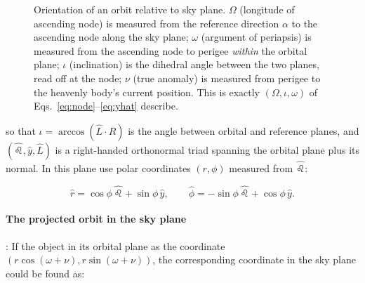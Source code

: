 \documentclass[11pt]{article}
\newcommand{\hatn}{\hat \leo}
\newcommand{\rhat}{\hat r}
\newcommand{\phihat}{\hat\phi}
\begin{document}
\begin{figure}[H]
{}
    \caption{Orientation of an orbit relative to sky plane. $\Omega$ (longitude of ascending node) is measured from the reference direction $\alpha$ to the ascending node along the sky plane; $\omega$ (argument of periapsis) is measured from the ascending node to perigee \emph{within} the orbital plane; $\iota$ (inclination) is the dihedral angle between the two planes, read off at the node; $\nu$ (true anomaly) is measured from perigee to the heavenly body's current position. This is exactly $(\Omega,\iota,\omega)$ of Eqs.~\eqref{eq:node}--\eqref{eq:yhat} describe.}
\label{fig:elements}
\end{figure}
so that $\iota=\arccos(\hat L\cdot\hat R)$ is the angle between orbital and reference planes, and $(\hatn,\hat y,\hat L)$ is a right-handed orthonormal triad spanning the orbital plane plus its normal. In this plane use polar coordinates $(r,\phi)$ measured from $\hatn$:

\begin{equation}
\rhat=\cos\phi\,\hatn+\sin\phi\,\hat y,\qquad
\phihat=-\sin\phi\,\hatn+\cos\phi\,\hat y. \label{eq:rhat_phihat}
\end{equation}
\paragraph{The projected orbit in the sky plane}: If the object in its orbital plane as the coordinate $(r\cos(\omega+\nu),r\sin(\omega+\nu))$, the corresponding coordinate in the sky plane could be found as:
\end{document}
